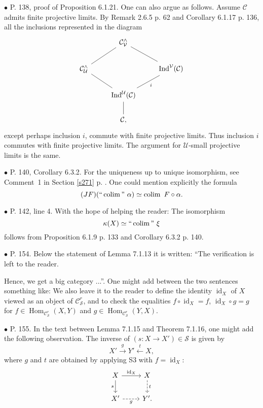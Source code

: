 \documentclass[12pt]{article}
\theoremstyle{remark}
\newcommand{\bu}{\bullet}
\newcommand{\n}{\noindent}
\newcommand{\C}{\mathcal C}
\newcommand{\U}{\mathcal U}
\newcommand{\V}{\mathcal V}
\DeclareMathOperator*{\coli}{colim}
\DeclareMathOperator{\id}{id}
\DeclareMathOperator{\Hom}{Hom}
\DeclareMathOperator{\Ind}{Ind}
\begin{document}

\n$\bu$ P. 138, proof of Proposition 6.1.21. One can also argue as follows. Assume $\C$ admits finite projective limits. By Remark 2.6.5 p. 62 and Corollary 6.1.17 p. 136, all the inclusions represented in the diagram 
\[
\begin{tikzcd}
{}&\C^\wedge_\V\ar[-]{ld}\ar[-]{rd}\\
\C^\wedge_\U\ar[-]{rd}&&\Ind^\V(\C)\ar[-]{ld}{i}\\
&\Ind^\U(\C)\ar[-]{d}\\
&\C,
\end{tikzcd}
\]
except perhaps inclusion $i$, commute with finite projective limits. Thus inclusion $i$ commutes with finite projective limits. The argument for $\U$-small projective limits is the same. 


\n$\bu$ P. 140, Corollary 6.3.2. For the uniqueness up to unique isomorphism, see Comment~1 in Section \ref{s271} p. \pageref{s271}. One could mention explicitly the formula 
%
\begin{equation}\label{140}
(JF)(``\coli"\ \alpha)\simeq\coli\ F\circ\alpha.
\end{equation}


\n$\bu$ P. 142, line 4. With the hope of helping the reader: The isomorphism 
$$
\kappa(X)\simeq``\coli"\ \xi
$$
follows from Proposition 6.1.9 p. 133 and Corollary 6.3.2 p. 140. 

% 

\n$\bu$ P. 154. Below the statement of Lemma 7.1.13 it is written: ``The verification is left to the reader.

Hence, we get a big category ...''. One might add between the two sentences something like: We also leave it to the reader to define the identity $\id_X$ of $X$ viewed as an object of $\C^r_{\mathcal S}$, and to check the equalities $f\circ\id_X=f$, $\id_X\circ g=g$ for $f\in\Hom_{\C^r_{\mathcal S}}(X,Y)$ and $g\in\Hom_{\C^r_{\mathcal S}}(Y,X)$. 

%

\n$\bu$ P. 155. In the text between Lemma 7.1.15 and Theorem 7.1.16, one might add the following observation. The inverse of $(s:X\to X')\in\mathcal S$ is given by 
$$
X'\overset{g}{\to}Y'\overset{t}{\leftarrow}X,
$$
where $g$ and $t$ are obtained by applying S3 with $f=\id_X$:
$$
\begin{tikzcd}
X\ar{r}{\id_X}\ar{d}[swap]{s}&X\ar[dashed]{d}{t}\\ X'\ar[dashed]{r}[swap]{g}&Y'.
\end{tikzcd}
$$ 
\end{document}
